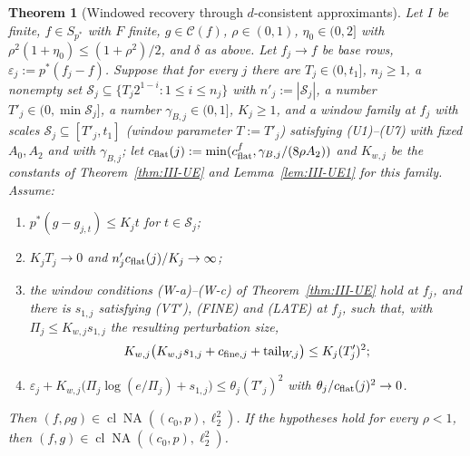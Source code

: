 \documentclass[10pt]{amsart}
\newtheorem{theorem}{Theorem}[section]
\theoremstyle{definition}
\theoremstyle{remark}
\newcommand{\NA}{\operatorname{NA}}
\newcommand{\Cset}{\mathcal C}
\newcommand{\cl}{\operatorname{cl}}
\begin{document}
\begin{theorem}[Windowed recovery through $d$-consistent approximants]
\label{thm:III-Eeng}
Let $I$ be finite, $f\in S_{p^*}$ with $F$ finite, $g\in\Cset(f)$, $\rho\in(0,1)$,
$\eta_0\in(0,2]$ with $\rho^2(1+\eta_0)\le(1+\rho^2)/2$, and $\delta$ as above.
Let $f_j\to f$ be base rows, $\varepsilon_j:=p^*(f_j-f)$.  Suppose that for every
$j$ there are $T_j\in(0,t_1]$, $n_j\ge1$, a nonempty set $\mathcal S_j\subseteq
\{T_j2^{1-i}:1\le i\le n_j\}$ with $n'_j:=|\mathcal S_j|$, a number
$T'_j\in(0,\min\mathcal S_j]$, a number $\gamma_{B,j}\in(0,1]$, $K_j\ge1$, and a
window family at $f_j$ with scales $\mathcal S_j\subseteq[T'_j,t_1]$ \textup{(}window parameter $T:=T'_j$\textup{)} satisfying
\textup{(U1)--(U7)} with \emph{fixed} $A_0,A_2$ and with $\gamma_{B,j}$; let
$c_{\rm flat}(j):=\min(c^f_{\rm flat},\gamma_{B,j}/(8\rho A_2))$ and $K_{w,j}$
be the constants of Theorem~\textup{\ref{thm:III-UE}} and
Lemma~\textup{\ref{lem:III-UE1}} for this family.  Assume:
\begin{enumerate}
\item[(E-c)] $p^*(g-g_{j,t})\le K_jt$ for $t\in\mathcal S_j$;
\item[(E-d)] $K_jT_j\to0$ and $n'_jc_{\rm flat}(j)/K_j\to\infty$;
\item[(E-f)] the window conditions \textup{(W-a)--(W-c)} of
Theorem~\textup{\ref{thm:III-UE}} hold at $f_j$, and there is $s_{1,j}$ satisfying
\textup{(VT$'$)}, \textup{(FINE)} and \textup{(LATE)} at $f_j$, such that, with
$\Pi_j\le K_{w,j}s_{1,j}$ the resulting perturbation size,
\[
 K_{w,j}\big(K_{w,j}s_{1,j}+c_{{\rm fine},j}+\mathrm{tail}_{W,j}\big)\le K_j(T'_j)^2;
\]
\item[(E-e)] $\varepsilon_j+K_{w,j}\big(\Pi_j\log(e/\Pi_j)+s_{1,j}\big)\le
\theta_j(T'_j)^2$ with $\theta_j/c_{\rm flat}(j)^2\to0$.
\end{enumerate}
Then $(f,\rho g)\in\cl\NA((c_0,p),\ell_2^2)$.  If the hypotheses hold for every
$\rho<1$, then $(f,g)\in\cl\NA((c_0,p),\ell_2^2)$.
\end{theorem}
\end{document}
